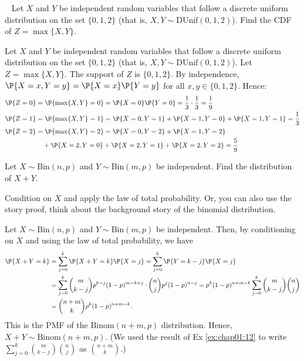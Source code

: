 \begin{exercise}~
	Let $X$ and $Y$ be independent random variables that follow a discrete uniform distribution on the set $\{0, 1, 2\}$ (that is, $X,Y \sim \text{DUnif}(0,1,2)$). Find the CDF of $Z = \max\{X, Y\}$.
 	\begin{solution}
 		Let $X$ and $Y$ be independent random variables that follow a discrete uniform distribution on the set $\{0, 1, 2\}$ (that is, $X,Y \sim \text{DUnif}(0,1,2)$). Let $Z = \max\{X, Y\}$. The support of $Z$ is $\{0, 1, 2\}$. By independence, $\P{X = x, Y = y} = \P{X = x} \P{Y = y}$ for all $x, y \in \{0,1,2\}$. Hence:
		\begin{align*}
 			\P{Z = 0} & = \P{\max\{X, Y\} = 0} = \P{X = 0} \P{Y = 0} = \frac{1}{3} \cdot \frac{1}{3} = \frac{1}{9} \\
 			\P{Z = 1} & = \P{\max\{X, Y\} = 1} = \P{X = 0, Y = 1} + \P{X = 1, Y = 0} + \P{X = 1, Y = 1} = \frac{1}{3} \\
 			\P{Z = 2} & = \P{\max\{X, Y\} = 2} = \P{X = 0, Y = 2} + \P{X = 1, Y = 2} \\
 			& \quad + \P{X = 2, Y = 0} + \P{X = 2, Y = 1} + \P{X = 2, Y = 2} = \frac{5}{9}
 		\end{align*}
 	\end{solution}
\end{exercise}

\begin{exercise}\label{ex:chap03:10}
 	Let $X \sim \text{Bin}(n, p)$ and $Y \sim \text{Bin}(m, p)$ be independent. Find the distribution of $X + Y$.
 	\begin{hint}
 		Condition on $X$ and apply the law of total probability. Or, you can also use the story proof, think about the background story of the binomial distribution.
 	\end{hint}
	\begin{solution}
		Let $X \sim \text{Bin}(n, p)$ and $Y \sim \text{Bin}(m, p)$ be independent. Then, by conditioning on $X$ and using the law of total probability, we have
		\begin{align*}
			\P{X + Y = k} & = \sum_{j = 0}^k \P{X + Y = k} \P{X = j} = \sum_{j = 0}^k \P{Y = k - j} \P{X = j} \\
			& = \sum_{j = 0}^k \binom{m}{k - j} p^{k - j} (1 - p)^{m - k + j} \cdot \binom{n}{j} p^j (1 - p)^{n - j} = p^k (1 - p)^{n + m - k} \sum_{j = 0}^k \binom{m}{k - j} \binom{n}{j} \\
			& = \binom{n + m}{k} p^k (1 - p)^{n + m - k}.
		\end{align*}
		This is the PMF of the $\text{Binom}(n + m, p)$ distribution. Hence, $X + Y \sim \text{Binom}(n + m, p)$. 	(We used the result of Ex \ref{ex:chap01:12} to write $\sum_{j = 0}^k \binom{m}{k - j} \binom{n}{j}$ as $\binom{n + m}{k}$.)
	\end{solution}
\end{exercise}

